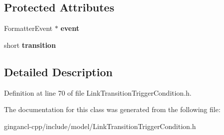 \subsection*{Protected Attributes}
\begin{CompactItemize}
\item 
FormatterEvent $\ast$ {\bf event}\label{classbr_1_1pucrio_1_1telemidia_1_1ginga_1_1ncl_1_1model_1_1link_1_1LinkTransitionTriggerCondition_c0141f472cfbecf4656651e1588d1b02}

\item 
short {\bf transition}\label{classbr_1_1pucrio_1_1telemidia_1_1ginga_1_1ncl_1_1model_1_1link_1_1LinkTransitionTriggerCondition_715ad1ca88ad62fe9dab2d2fba037aa3}

\end{CompactItemize}


\subsection{Detailed Description}




Definition at line 70 of file LinkTransitionTriggerCondition.h.

The documentation for this class was generated from the following file:\begin{CompactItemize}
\item 
gingancl-cpp/include/model/LinkTransitionTriggerCondition.h\end{CompactItemize}
